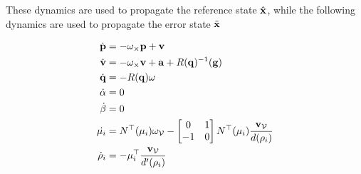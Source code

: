 \documentclass[letterpaper, 10 pt, conference]{ieeeconf}  %
\begin{document}
These dynamics are used to propagate the reference state $\hat{\mathbf{x}}$, while the following dynamics are used to propagate the error state $\tilde{\mathbf{x}}$

\begin{equation}
\begin{aligned}
	\dot{\mathbf{p}} &= -\mathbf{\omega}_\times \mathbf{p} + \mathbf{v}\\
	\dot{\mathbf{v}} &= -\mathbf{\omega}_\times \mathbf{v} + \mathbf{a} + R(\mathbf{q})^{-1}(\mathbf{g}) \\
	\dot{\mathbf{q}} &= -R(\mathbf{q})\mathbf{\omega} \\
	\dot{\mathbf{\alpha}} &= 0\\
	\dot{\mathbf{\beta}} &= 0 \\
	\dot{\mathbf{\mu}_i} &= N^\top(\mathbf{\mu}_i)\mathbf{\omega}_{\mathcal{V}} - \begin{bmatrix} 0 & 1 \\ -1 & 0 \end{bmatrix}N^\top(\mu_i)\dfrac{\mathbf{v}_{\mathcal{V}}}{d(\rho_i)} \\
	\dot{\rho}_i &= -\mathbf{\mu}_i^\top \dfrac{\mathbf{v}_{\mathcal{V}}}{d'(\rho_i)}
\end{aligned}
\end{equation}







% 
% 
\end{document}
